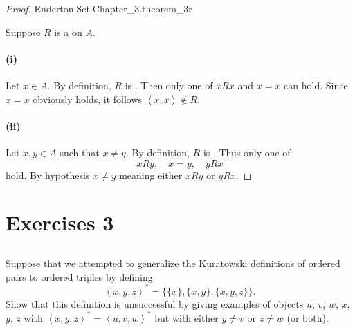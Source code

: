 \documentclass{report}
\newcommand{\pair}[1]{\left< #1 \right>}
\begin{document}
\begin{proof}

    {Enderton.Set.Chapter\_3.theorem\_3r}

  Suppose $R$ is a  on $A$.

  \paragraph{(i)}%

    Let $x \in A$.
    By definition, $R$ is .
    Then only one of $xRx$ and $x = x$ can hold.
    Since $x = x$ obviously holds, it follows $\pair{x, x} \not\in R$.

  \paragraph{(ii)}%

    Let $x, y \in A$ such that $x \neq y$.
    By definition, $R$ is .
    Thus only one of $$xRy, \quad x = y, \quad yRx$$ hold.
    By hypothesis $x \neq y$ meaning either $xRy$ or $yRx$.

\end{proof}

\section{Exercises 3}%

\subsection{}%

Suppose that we attempted to generalize the Kuratowski definitions of ordered
  pairs to ordered triples by defining
  $$\pair{x, y, z}^* = \{\{x\}, \{x, y\}, \{x, y, z\}\}.$$
Show that this definition is unsuccessful by giving examples of objects
  $u$, $v$, $w$, $x$, $y$, $z$ with
  $\pair{x, y, z}^* = \pair{u, v, w}^*$ but with either
  $y \neq v$ or $z \neq w$ (or both).
\end{document}
